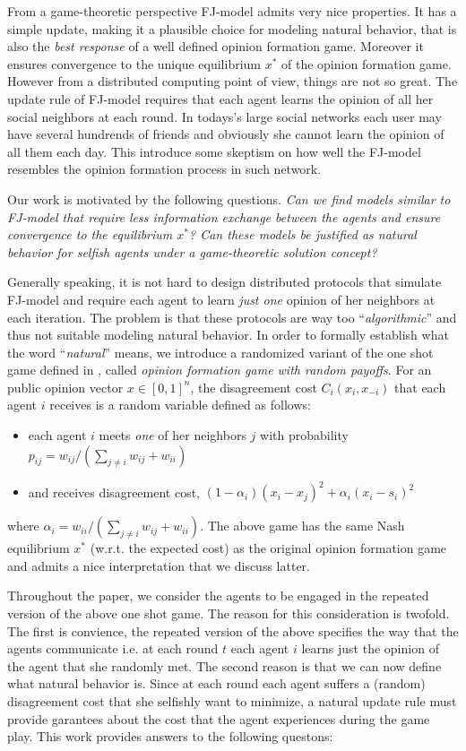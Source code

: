 From a game-theoretic perspective FJ-model admits
very nice properties. It has a simple update, making it
a plausible choice for modeling natural behavior, that
is also the \emph{best response} of a well
defined opinion formation game. Moreover it ensures
convergence to the unique equilibrium $x^*$ of the opinion
formation game. However from a
distributed computing point of view, things are not
so great. The update rule of FJ-model requires that each agent learns
the opinion of all her social neighbors at each
round. In todays's large social networks each user
may have several hundrends of friends and obviously
she cannot learn the opinion of all them each day.
This introduce some skeptism on how well the
FJ-model resembles the opinion formation process in such
network.

Our work is motivated by the following questions.
\emph{
Can we find models similar to FJ-model that
require less information exchange between the agents
and ensure convergence to the equilibrium $x^*$?
Can these models be justified as natural behavior for selfish
agents under a game-theoretic solution concept?}

Generally speaking, it is not hard to
design distributed protocols that simulate FJ-model
and require each agent to learn \emph{just one} opinion
of her neighbors at each iteration. The problem is that these protocols
are way too \enquote{\emph{algorithmic}} and thus not suitable modeling
natural behavior. In order to formally establish what
the word \enquote{\emph{natural}} means, we introduce a randomized
variant of the one shot game defined in \cite{BKO11},
called \emph{opinion formation game with random payoffs}.
For an public opinion vector $x \in [0,1]^n$, the disagreement
cost $C_i(x_i,x_{-i})$ that each agent $i$ receives is
a random variable defined as follows:
\begin{itemize}
 \item each agent $i$ meets \emph{one} of her neighbors $j$ with probability
 $p_{ij}=w_{ij}/(\sum_{j\neq i}w_{ij}+w_{ii})$
 \item and receives disagreement cost, $(1-\alpha_i)(x_i-x_j)^2 + \alpha_i(x_i-s_i)^2$
\end{itemize}
where $\alpha_i=w_{ii}/(\sum_{j\neq i}w_{ij}+w_{ii})$. The above game
has the same Nash equilibrium $x^*$ (w.r.t. the expected cost) as
the original opinion formation game and admits a nice interpretation
that we discuss latter.

Throughout the paper, we consider the agents to be engaged in the repeated
version of the above one shot game. The reason for this
consideration is twofold. The first is convience, the repeated
version of the above specifies the way that the agents communicate i.e.
at each round $t$ each agent $i$ learns just the opinion
of the agent that she randomly met. The second reason is that we can now define
what natural behavior is. Since at each round each agent
suffers a (random) disagreement cost that she selfishly want
to minimize, a natural update rule must provide garantees about
the cost that the agent experiences during the game play.
This work provides answers to the following questons:

